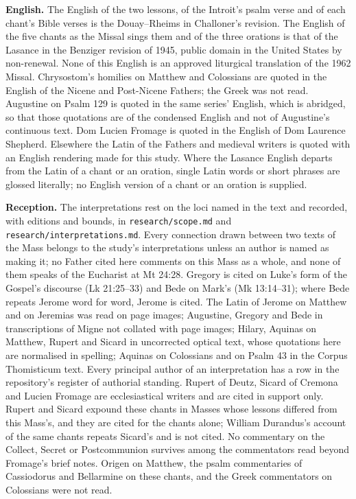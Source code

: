 {\textbf{English.} The English of the two lessons, of the Introit's psalm
verse and of each chant's Bible verses is the Douay--Rheims in Challoner's
revision. The English of the five chants as the Missal sings them and of the
three orations is that of the Lasance  in the Benziger
revision of 1945, public domain in the United States by non-renewal. None of
this English is an approved liturgical translation of the 1962 Missal.
Chrysostom's homilies on Matthew and Colossians are quoted in the English of
the Nicene and Post-Nicene Fathers; the Greek was not read. Augustine on
Psalm 129 is quoted in the same series' English, which is abridged, so that
those quotations are of the condensed English and not of Augustine's
continuous text. Dom Lucien Fromage is quoted in the English of Dom Laurence
Shepherd. Elsewhere the Latin of the Fathers and medieval writers is quoted
with an English rendering made for this study. Where the Lasance English
departs from the Latin of a chant or an oration, single Latin words or short
phrases are glossed literally; no English version of a chant or an oration is
supplied.

\textbf{Reception.} The interpretations rest on the loci named in the text and
recorded, with editions and bounds, in \texttt{research/scope.md} and
\texttt{research/interpretations.md}. Every connection drawn between two texts
of the Mass belongs to the study's interpretations unless an author is named as
making it; no Father cited here comments on this Mass as a whole, and none of
them speaks of the Eucharist at Mt 24:28. Gregory is cited on Luke's form of
the Gospel's discourse (Lk 21:25--33) and Bede on Mark's (Mk 13:14--31); where
Bede repeats Jerome word for word, Jerome is cited. The Latin of Jerome on
Matthew and on Jeremias was read on page images; Augustine, Gregory and Bede in
transcriptions of Migne not collated with page images; Hilary, Aquinas on
Matthew, Rupert and Sicard in uncorrected optical text, whose quotations here
are normalised in spelling; Aquinas on Colossians and on Psalm 43 in the Corpus
Thomisticum text. Every principal author of an interpretation has a row in the
repository's register of authorial standing. Rupert of Deutz, Sicard of
Cremona and Lucien Fromage are ecclesiastical writers and are cited in support
only. Rupert and Sicard expound these chants in Masses whose lessons differed
from this Mass's, and they are cited for the chants alone; William Durandus's
account of the same chants repeats Sicard's and is not cited. No commentary on
the Collect, Secret or Postcommunion survives among the commentators read
beyond Fromage's brief notes. Origen on Matthew, the psalm commentaries of
Cassiodorus and Bellarmine on these chants, and the Greek commentators on
Colossians were not read.

}
